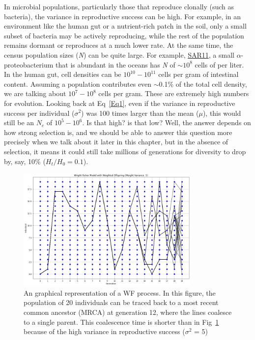 \documentclass[10pt,a4paper]{scrbook}
\begin{document}
In microbial populations, particularly those that reproduce clonally (such as bacteria), the variance in reproductive success can be high. For example, in an environment like the human gut or a nutrient-rich patch in the soil, only a small subset of bacteria may be actively reproducing, while the rest of the population remains dormant or reproduces at a much lower rate. At the same time, the census population sizes (\textit{N}) can be quite large. For example, \href{https://en.wikipedia.org/wiki/Candidatus_Pelagibacter_communis}{SAR11}, a small $\alpha$-proteobacterium that is abundant in the oceans has \textit{N} of $\sim10^8$  cells of  per liter. In the human gut, cell densities can be $10^{10} - 10^{11}$ cells per gram of intestinal content. Assuming a population contributes even $\sim$0.1\% of the total cell density, we are talking about $10^{7}-10^{8}$ cells per gram. These are extremely high numbers for evolution. Looking back at Eq~\ref{Eq1}, even if the variance in reproductive success per individual (\(\sigma^2\)) was 100 times larger than the mean (\(\mu\)), this would still be an $N_e$ of $10^5-10^6$. Is that high? is that low? Well, the answer depends on how strong selection is, and we should be able to answer this question more precisely when we talk about it later in this chapter, but in the absence of selection, it means  it could still take millions of generations for diversity to drop by, say, 10\% (\(H_t/H_0 = 0.1\)). 

\begin{figure}[htbp]
    \centering
    \includegraphics[width=0.8\textwidth]{WF2.png}  %
    \caption{An graphical representation of a WF process. In this figure, the population of 20 individuals can be traced back to a most recent common ancestor (MRCA) at generation 12, where the lines coalesce to a single parent. This coalescence time is shorter than in Fig~\ref{fig:WF1} because of the high variance in reproductive success (\(\sigma^2\) = 5)}
    \label{fig:WF1}
\end{figure}
\end{document}
